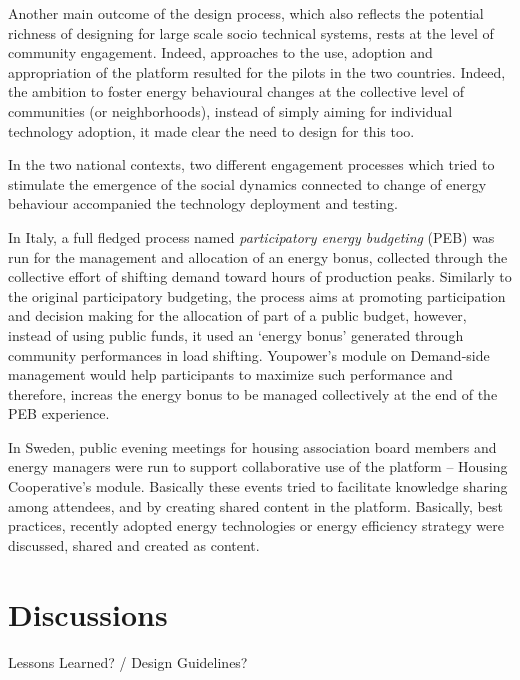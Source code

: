 Another main outcome of the design process, which also reflects the potential richness of designing for large scale
socio technical systems, rests at the level of community engagement. Indeed, approaches to the
use, adoption and appropriation of the platform resulted for the pilots in the two countries. Indeed, 
the ambition to foster energy behavioural changes at the collective level of communities (or neighborhoods),
instead of simply aiming for individual technology adoption, it made clear the need to design for
this too.

In the two national contexts, two different engagement processes which tried to stimulate the
emergence of the social dynamics connected to change of energy behaviour accompanied the technology deployment
and testing. 

In Italy, a full fledged process named \textit{participatory energy budgeting} (PEB) \cite{capaccioli_exploring_2017,capaccioli_exploring_2016}
was run for the management and allocation of an energy bonus, collected through the collective effort
of shifting demand toward hours of production peaks. Similarly to the original participatory budgeting,
the process aims at promoting participation and decision making for the allocation of part of a public budget, however,
instead of using public funds, it used an `energy bonus' generated through community performances in load shifting. 
Youpower's module on Demand-side management would help participants to maximize such performance and therefore, increas the energy bonus
to be managed collectively at the end of the PEB experience.

In Sweden, public evening meetings for housing association board members and energy managers were run
to support collaborative use of the platform -- Housing Cooperative's module. Basically these events tried to
facilitate knowledge sharing among attendees, and by creating shared content in the platform. Basically,
best practices, recently adopted energy technologies or energy efficiency strategy were discussed,
shared and created as content.

\section{Discussions} %
\label{sec:disc}

\begin{svgraybox}
Lessons Learned?  / Design Guidelines? 
\end{svgraybox}